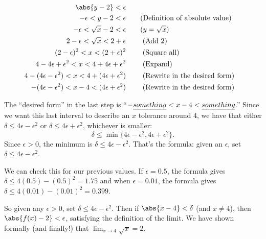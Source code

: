 \begin{example}
\begin{align*}
\abs{y - 2} < \epsilon \\
-\epsilon < y - 2 < \epsilon & \qquad \textrm{(Definition of absolute value)}\\
-\epsilon < \sqrt{x} - 2 < \epsilon  &\qquad\text{($y=\sqrt{x}$)}\\
2 - \epsilon < \sqrt{x} < 2+ \epsilon &\qquad \textrm{ (Add 2)}\\
(2 - \epsilon)^2 < x < (2+ \epsilon) ^2 &\qquad \textrm{ (Square all)}\\
4 - 4\epsilon + \epsilon^2 < x < 4 + 4\epsilon + \epsilon^2 &\qquad \textrm{ (Expand)}\\
4 - (4\epsilon - \epsilon^2) < x < 4 + (4\epsilon + \epsilon^2) &\qquad \textrm{ (Rewrite in the desired form)} \\
- (4\epsilon - \epsilon^2) < x-4 < (4\epsilon + \epsilon^2) &\qquad \textrm{ (Rewrite in the desired form)}
\end{align*}

The ``desired form'' in the last step is ``$-\emph{something} < x-4 < \emph{something}$.''
Since we want this last interval to describe an $x$ tolerance around 4, we have that either $\delta \leq 4\epsilon - \epsilon^2$ or $\delta \leq 4\epsilon + \epsilon^2$, whichever is smaller: \[\delta \leq \min\{4\epsilon - \epsilon^2, 4\epsilon + \epsilon^2\}\text{.}\]  Since $\epsilon > 0$, the minimum is $\delta \leq 4\epsilon - \epsilon^2$.  That's the formula: given an $\epsilon$, set $\delta \leq 4\epsilon-\epsilon^2$. 

We can check this for our previous values.  If $\epsilon=0.5$, the formula gives
$\delta \leq 4(0.5) - (0.5)^2 = 1.75$ and when $\epsilon=0.01$, the formula gives $\delta \leq 4(0.01) - (0.01)^2 = 0.399$.

So given any $\epsilon >0$, set $\delta \leq 4\epsilon - \epsilon^2$. Then if $\abs{x-4}<\delta$ (and $x\neq 4$), then $\abs{f(x) - 2} < \epsilon$,  satisfying the definition of the limit.  We have shown formally (and finally!) that $\displaystyle \lim_{x\rightarrow 4} \sqrt{x} = 2 $.
\end{example}


